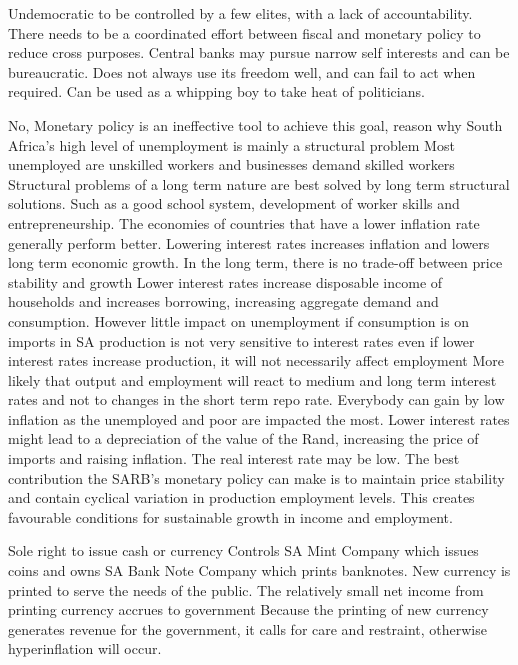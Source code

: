 \documentclass[12pt]{examnotes}
\begin{document}
\ra Undemocratic to be controlled by a few elites, with a lack of accountability. 
\ra There needs to be a coordinated effort between fiscal and monetary policy to reduce cross purposes.
\ra Central banks may pursue narrow self interests and can be bureaucratic. 
\ra Does not always use its freedom well, and can fail to act when required.
\ra Can be used as a whipping boy to take heat of politicians.


\ra No, Monetary policy is an ineffective tool to achieve this goal, reason why
 South Africa's high level of unemployment is mainly a structural problem
\rna Most unemployed are unskilled workers and businesses demand skilled workers
\rna Structural problems of a long term nature are best solved by long term structural solutions.
\rna Such as a good school system, development of worker skills and entrepreneurship.
 The economies of countries that have a lower inflation rate generally perform better.
\rna Lowering interest rates increases inflation and lowers long term economic growth.
\rna In the long term, there is no trade-off between price stability and growth
 Lower interest rates increase disposable income of households and increases borrowing, increasing aggregate demand and consumption. However 
\ra little impact on unemployment if consumption is on imports
\ra in SA production is not very sensitive to interest rates
\ra even if lower interest rates increase production, it will not necessarily affect employment
\ra More likely that output and employment will react to medium and long term interest rates and not to changes in the short term repo rate.
 Everybody can gain by low inflation as the unemployed and poor are impacted the most. 
 Lower interest rates might lead to a depreciation of the value of the Rand, increasing the price of imports and raising inflation.
 The real interest rate may be low.
\ra The best contribution the SARB's monetary policy can make is to maintain price stability and contain cyclical variation in production employment levels. This creates favourable conditions for sustainable growth in income and employment.

 Sole right to issue cash or currency
\rna Controls SA Mint Company which issues coins and owns SA Bank Note Company which prints banknotes.
\rna New currency is printed to serve the needs of the public. 
\rna The relatively small net income from printing currency accrues to government
\rna Because the printing of new currency generates revenue for the government, it calls for care and restraint, otherwise hyperinflation will occur.
\end{document}
